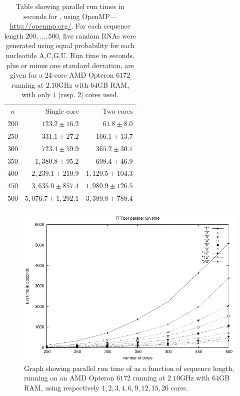 \begin{table}[!ht]
\centering
\begin{tabularx}{\linewidth}{c *{2}{R}}
\toprule
\small{$n$} & \small{Single core} & \small{Two cores} \\
\cmidrule(lr){1-3}
$200$ & $123.2 \pm 16.2$ & $61.8 \pm 8.0$ \\
$250$ & $331.1 \pm 27.2$ & $166.1 \pm 13.7$ \\
$300$ & $723.4 \pm 59.9$ & $365.2 \pm 30.1$ \\
$350$ & $1,380.8 \pm 95.2$ & $698.4 \pm 46.9$ \\
$400$ & $2,239.1 \pm 210.9$ & $1,129.5 \pm 104.3$ \\
$450$ & $3,635.0 \pm 857.4$ & $1,980.9 \pm 126.5$ \\
$500$ & $5,076.7 \pm 1,292.1$ & $3,389.8 \pm 788.4$ \\
\bottomrule
\end{tabularx}
\caption[Table showing parallel run times in seconds
for \fftbor, using OpenMP]{Table showing parallel run times in seconds
for \fftbor, using OpenMP---\url{http://openmp.org/}.
For each sequence length $200,\dots,500$,
five random RNAs were generated using equal probability for each nucleotide
A,C,G,U. Run time in seconds, plus or minus one standard deviation, are
given for a $24$-core
AMD Opteron $6172$ running at $2.10$GHz with $64$GB RAM, with only $1$ [resp. $2$] cores
used.}
\label{table:fftborBenchmarkingParallel}
\end{table}

\begin{figure}[!ht]
\centering
\includegraphics[width=.75\textwidth]{Figures/FFTbor/fftborParallelRunTimes.pdf}
\caption[]{Graph showing parallel run time of \fftbor as a function of
sequence length, running on an AMD Opteron $6172$ running at $2.10$GHz with $64$GB RAM,
using respectively $1,2,3,4,6,9,12,15,20$ cores.
}
\label{fig:fftbor:benchmarkingParallel}
\end{figure}

